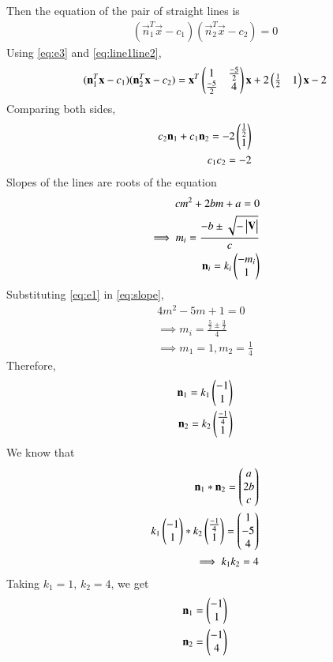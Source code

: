 \documentclass[journal,12pt,twocolumn]{IEEEtran}
\begin{document}
Then the equation of the pair of straight lines is
\begin{align}\label{eq:line1line2}
    (\vec{n}_1^T\vec{x}-c_1)(\vec{n}_2^T\vec{x}-c_2) = 0
\end{align}
Using \eqref{eq:e3} and \eqref{eq:line1line2},
\begin{align}
    (\mathbf{n}_1^T\mathbf{x}-c_1)(\mathbf{n}_2^T\mathbf{x}-c_2) = \mathbf{x}^T\begin{pmatrix}1 & \frac{-5}{2} \\ \frac{-5}{2} & 4\end{pmatrix}\mathbf{x} + 2\begin{pmatrix}\frac{1}{2} & 1\end{pmatrix}\mathbf{x} -2
\end{align}
Comparing both sides,
\begin{align}
    c_2\mathbf{n}_1+c_1\mathbf{n}_2 = -2\begin{pmatrix}\frac{1}{2} \\ 1\end{pmatrix}\label{eq:c1c2}\\
    c_1c_2 = -2
\end{align}
Slopes of the lines are roots of the equation
\begin{align}
    cm^2+2bm+a=0 \label{eq:slope}\\
    \implies m_i = \frac{-b\pm \sqrt{-\begin{vmatrix}\mathbf{V}\end{vmatrix}}}{c}\\
    \mathbf{n}_i = k_i\begin{pmatrix}-m_i \\ 1\end{pmatrix}
\end{align}
Substituting \eqref{eq:e1} in \eqref{eq:slope},
\begin{align}
    4m^2-5m+1=0\\
    \implies m_i = \frac{\frac{5}{2}\pm \frac{3}{2}}{4} \\
    \implies m_1 = 1, m_2 = \frac{1}{4}
\end{align}
Therefore,
\begin{align}
    \mathbf{n}_1=k_1\begin{pmatrix}-1 \\ 1\end{pmatrix}\\
    \mathbf{n}_2=k_2\begin{pmatrix}\frac{-1}{4} \\ 1\end{pmatrix}
\end{align}
We know that
\begin{align}
	\label{n1n2}\mathbf{n}_1*\mathbf{n}_2 = \begin{pmatrix}a\\2b\\c\end{pmatrix}\\
	k_1\begin{pmatrix}-1 \\ 1\end{pmatrix}*k_2\begin{pmatrix}\frac{-1}{4} \\ 1\end{pmatrix} = \begin{pmatrix}1 \\ -5 \\ 4\end{pmatrix}\\
	\implies k_1k_2 = 4
\end{align}
Taking $k_1 = 1$, $k_2 = 4$, we get
\begin{align}
    \mathbf{n}_1 = \begin{pmatrix}-1 \\ 1\end{pmatrix}\nonumber\\
    \mathbf{n}_2 = \begin{pmatrix}-1 \\ 4\end{pmatrix}\label{eq:nvalues}
\end{align}
\end{document}
